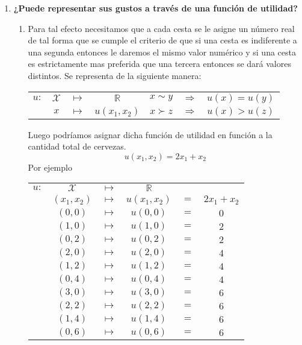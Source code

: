 \begin{enumerate}
    \item \textbf{¿Puede representar sus gustos a través de una función de utilidad?}\\

	\begin{enumerate}[\bfseries (3.1)]
	    \item Para tal efecto necesitamos que a cada cesta se le asigne un número real de tal forma que se cumple el criterio de que si una cesta es indiferente a una segunda entonces le daremos el mismo valor numérico y si una cesta es estrictamente mas preferida que una tercera entonces se dará valores distintos. Se representa de la siguiente manera:     
		\begin{center}
		    \begin{tabular}{rccc|ccc}
			$u:$&$\mathcal{X}$ & $\longmapsto$ & $\mathbb{R}$ & $x \sim y$ & $\Rightarrow$ & $u(x)=u(y)$\\
			    & $x$ & $\longmapsto$ & $u(x_1,x_2)$ & $x\succ z$&$\Rightarrow$&$u(x)>u(z)$\\
		    \end{tabular}
		\end{center}
		\vspace{.3cm}
		Luego podríamos asignar dicha función de utilidad en función a la cantidad total de cervezas. 
		$$u(x_1,x_2)=2x_1+x_2$$
		Por ejemplo

		\begin{center}
		    \begin{tabular}{cccccc}
			$u:$&$\mathcal{X}$&$\longmapsto$&$\mathbb{R}$&&\\
			 & $(x_1,x_2)$ & $\longmapsto$&$u(x_1,x_2)$&$=$&$2x_1+x_2$\\
			    & $(0,0)$ & $\longmapsto$ & $u(0,0)$ & $=$ & $0$\\
			    & $(1,0)$ & $\longmapsto$ & $u(1,0)$ & $=$ & $2$\\
			    & $(0,2)$ & $\longmapsto$ & $u(0,2)$ & $=$ & $2$\\
			    & $(2,0)$ & $\longmapsto$ & $u(2,0)$ & $=$ & $4$\\
			    & $(1,2)$ & $\longmapsto$ & $u(1,2)$ & $=$ & $4$\\
			    & $(0,4)$ & $\longmapsto$ & $u(0,4)$ & $=$ & $4$\\
			    & $(3,0)$ & $\longmapsto$ & $u(3,0)$ & $=$ & $6$\\
			    & $(2,2)$ & $\longmapsto$ & $u(2,2)$ & $=$ & $6$\\
			    & $(1,4)$ & $\longmapsto$ & $u(1,4)$ & $=$ & $6$\\
			    & $(0,6)$ & $\longmapsto$ & $u(0,6)$ & $=$ & $6$\\
		    \end{tabular}
		\end{center} 
		\vspace{.5cm}


\end{enumerate}
\end{enumerate}
